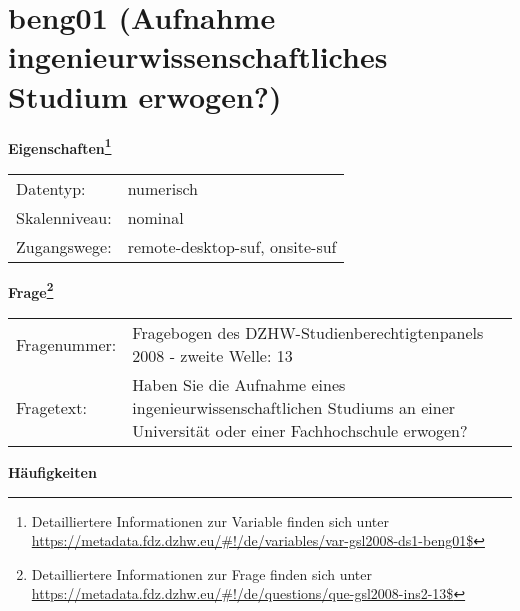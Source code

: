 
    \setcounter{footnote}{0}

    \vspace*{-1.8cm}
	\section{beng01 (Aufnahme ingenieurwissenschaftliches Studium erwogen?)}
	\label{section:beng01}



    \vspace*{0.5cm}
    \noindent\textbf{Eigenschaften\footnote{Detailliertere Informationen zur Variable finden sich unter
		\url{https://metadata.fdz.dzhw.eu/\#!/de/variables/var-gsl2008-ds1-beng01$}}}\\
	\begin{tabularx}{\hsize}{@{}lX}
	Datentyp: & numerisch \\
	Skalenniveau: & nominal \\
	Zugangswege: &
	  remote-desktop-suf, 
	  onsite-suf
 \\
    \end{tabularx}



				\vspace*{0.5cm}
                \noindent\textbf{Frage\footnote{Detailliertere Informationen zur Frage finden sich unter
		              \url{https://metadata.fdz.dzhw.eu/\#!/de/questions/que-gsl2008-ins2-13$}}}\\
				\begin{tabularx}{\hsize}{@{}lX}
					Fragenummer: &
					  Fragebogen des DZHW-Studienberechtigtenpanels 2008 - zweite Welle:
					  13
 \\
					Fragetext: & Haben Sie die Aufnahme eines ingenieurwissenschaftlichen Studiums an einer Universität oder einer Fachhochschule erwogen? \\
				\end{tabularx}





        		\vspace*{0.5cm}
                \noindent\textbf{Häufigkeiten}

